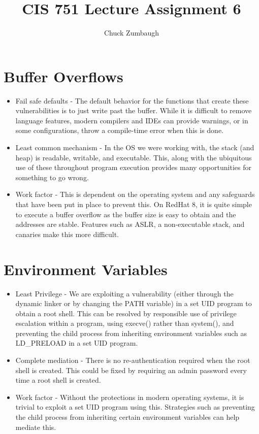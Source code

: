 \documentclass[12pt]{article}
\author{Chuck Zumbaugh}
\title{CIS 751 Lecture Assignment 6}
\begin{document}
\maketitle

\section{Buffer Overflows}
\begin{itemize}
\item Fail safe defaults - The default behavior for the functions that create these vulnerabilities is to just write past the buffer. While it is difficult to remove language features, modern compilers and IDEs can provide warnings, or in some configurations, throw a compile-time error when this is done.
\item Least common mechanism - In the OS we were working with, the stack (and heap) is readable, writable, and executable. This, along with the ubiquitous use of these throughout program execution provides many opportunities for something to go wrong.
\item Work factor - This is dependent on the operating system and any safeguards that have been put in place to prevent this. On RedHat 8, it is quite simple to execute a buffer overflow as the buffer size is easy to obtain and the addresses are stable. Features such as ASLR, a non-executable stack, and canaries make this more difficult.
\end{itemize}

\section{Environment Variables}
\begin{itemize}
\item Least Privilege - We are exploiting a vulnerability (either through the dynamic linker or by changing the PATH variable) in a set UID program to obtain a root shell. This can be resolved by responsible use of privilege escalation within a program, using execve() rather than system(), and preventing the child process from inheriting environment variables such as LD\_PRELOAD in a set UID program.
\item Complete mediation - There is no re-authentication required when the root shell is created. This could be fixed by requiring an admin password every time a root shell is created.
\item Work factor - Without the protections in modern operating systems, it is trivial to exploit a set UID program using this. Strategies such as preventing the child process from inheriting certain environment variables can help mediate this.
\end{itemize}
\end{document}
